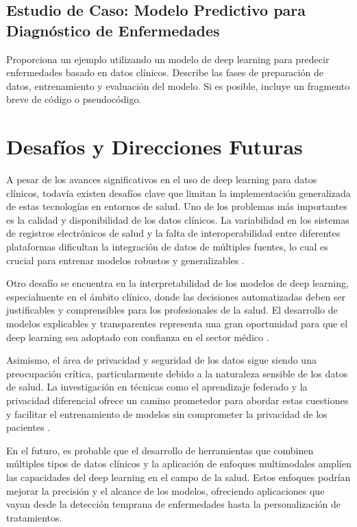 \documentclass{article}
\begin{document}
\subsection{Estudio de Caso: Modelo Predictivo para Diagnóstico de Enfermedades}
Proporciona un ejemplo utilizando un modelo de deep learning para predecir enfermedades basado en datos clínicos. Describe las fases de preparación de datos, entrenamiento y evaluación del modelo. Si es posible, incluye un fragmento breve de código o pseudocódigo.

\section{Desafíos y Direcciones Futuras}

A pesar de los avances significativos en el uso de deep learning para datos clínicos, todavía existen desafíos clave que limitan la implementación generalizada de estas tecnologías en entornos de salud. Uno de los problemas más importantes es la calidad y disponibilidad de los datos clínicos. La variabilidad en los sistemas de registros electrónicos de salud y la falta de interoperabilidad entre diferentes plataformas dificultan la integración de datos de múltiples fuentes, lo cual es crucial para entrenar modelos robustos y generalizables \cite{johnson2016mimic}.

Otro desafío se encuentra en la interpretabilidad de los modelos de deep learning, especialmente en el ámbito clínico, donde las decisiones automatizadas deben ser justificables y comprensibles para los profesionales de la salud. El desarrollo de modelos explicables y transparentes representa una gran oportunidad para que el deep learning sea adoptado con confianza en el sector médico \cite{holzinger2017we}.

Asimismo, el área de privacidad y seguridad de los datos sigue siendo una preocupación crítica, particularmente debido a la naturaleza sensible de los datos de salud. La investigación en técnicas como el aprendizaje federado y la privacidad diferencial ofrece un camino prometedor para abordar estas cuestiones y facilitar el entrenamiento de modelos sin comprometer la privacidad de los pacientes \cite{rieke2020future}.

En el futuro, es probable que el desarrollo de herramientas que combinen múltiples tipos de datos clínicos y la aplicación de enfoques multimodales amplíen las capacidades del deep learning en el campo de la salud. Estos enfoques podrían mejorar la precisión y el alcance de los modelos, ofreciendo aplicaciones que vayan desde la detección temprana de enfermedades hasta la personalización de tratamientos.
\end{document}
